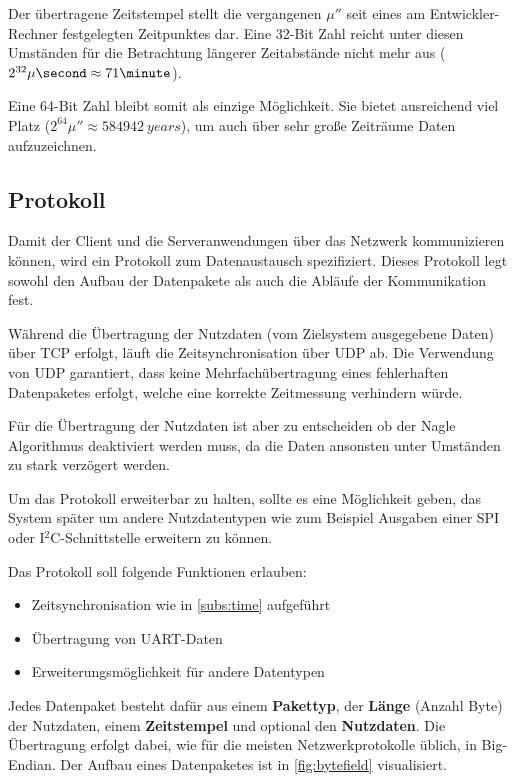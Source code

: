 Der übertragene Zeitstempel stellt die vergangenen $\mu\second$ seit
eines am Entwickler-Rechner festgelegten Zeitpunktes dar. Eine 32-Bit Zahl
reicht unter diesen Umständen für die Betrachtung längerer Zeitabstände nicht
mehr aus ($2^{32}\mu\second\approx 71\minute$).

Eine 64-Bit Zahl bleibt somit als einzige Möglichkeit. Sie bietet ausreichend
viel Platz ($2^{64}\mu\second\approx 584942~years$), um auch über sehr große
Zeiträume Daten aufzuzeichnen.
\subsection{Protokoll}
Damit der Client und die Serveranwendungen über das Netzwerk kommunizieren
können, wird ein Protokoll zum Datenaustausch spezifiziert. Dieses Protokoll
legt sowohl den Aufbau der Datenpakete als auch die Abläufe der Kommunikation
fest.

Während die Übertragung der Nutzdaten (vom Zielsystem ausgegebene Daten) über
TCP erfolgt, läuft die Zeitsynchronisation über UDP ab. Die Verwendung von UDP
garantiert, dass keine Mehrfachübertragung eines fehlerhaften Datenpaketes
erfolgt, welche eine korrekte Zeitmessung verhindern würde.

Für die Übertragung der Nutzdaten ist aber zu entscheiden ob der Nagle
Algorithmus\cite{RFC896} deaktiviert werden muss, da die Daten ansonsten unter
Umständen zu stark verzögert werden.

Um das Protokoll erweiterbar zu halten, sollte es eine Möglichkeit geben, das
System später um andere Nutzdatentypen wie zum Beispiel Ausgaben einer SPI oder
I$^2$C-Schnittstelle erweitern zu können.

\begin{minipage}[c]{\textwidth}
Das Protokoll soll folgende Funktionen erlauben:
\begin{itemize}
  \item Zeitsynchronisation wie in \autoref{subs:time} aufgeführt
  \item Übertragung von UART-Daten
  \item Erweiterungsmöglichkeit für andere Datentypen
\end{itemize}
\end{minipage}

Jedes Datenpaket besteht dafür aus einem \textbf{Pakettyp}, der \textbf{Länge}
(Anzahl Byte) der Nutzdaten, einem \textbf{Zeitstempel} und optional den
\textbf{Nutzdaten}. Die Übertragung erfolgt dabei, wie für die meisten
Netzwerkprotokolle üblich, in Big-Endian. Der Aufbau eines Datenpaketes ist in
\autoref{fig:bytefield} visualisiert.

